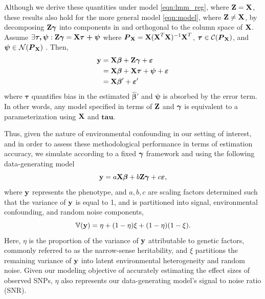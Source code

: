 Although we derive these quantities under model \ref{eqn:lmm_reg}, where $\textbf{Z} = \textbf{X}$, these results also hold for the more general model \ref{eqn:model}, where $\textbf{Z} \ne \textbf{X}$, by decomposing $\textbf{Z} \boldsymbol{\gamma}$ into components in and orthogonal to the column space of $\textbf{X}$. Assume  $\exists \boldsymbol{\tau, \psi}: \textbf{Z} \boldsymbol{\gamma} = \textbf{X} \boldsymbol{\tau + \psi}$ where $\boldsymbol{P}_{\textbf{X}} = \textbf{X} (\textbf{X}^T \textbf{X})^{-1} \textbf{X}^T$, $\boldsymbol{\tau} \in \mathcal{C}(\boldsymbol{P}_{\textbf{X}})$, and $\boldsymbol{\psi} \in \mathcal{N}(\boldsymbol{P}_{\textbf{X}})$ . Then,
\begin{align*}
    \textbf{y} &= \textbf{X}\boldsymbol{\beta} + \textbf{Z}\boldsymbol{\gamma} + \boldsymbol{\varepsilon}\\
    &= \textbf{X}\boldsymbol{\beta} + \textbf{X} \boldsymbol{\tau} + \boldsymbol{\psi} + \boldsymbol{\varepsilon}\\
    &=  \textbf{X} \boldsymbol{\beta}' + \boldsymbol{\varepsilon}'
\end{align*}
where $\boldsymbol{\tau}$ quantifies bias in the estimated $\boldsymbol{\hat{\beta}'}$ and $\boldsymbol{\psi}$ is absorbed by the error term. In other words, any model specified in terms of $\textbf{Z}$ and $\boldsymbol{\gamma}$ is equivalent to a parameterization using $\textbf{X}$ and $\boldsymbol{tau}$.

 Thus, given the nature of environmental confounding in our setting of interest, and in order to assess these methodological performance in terms of estimation accuracy, we simulate according to a fixed $\boldsymbol{\gamma}$ framework and using the following data-generating model
\begin{equation}
    \label{eqn:sim}
    \textbf{y} = a \textbf{X} \boldsymbol{\beta} + b \textbf{Z} \boldsymbol{\gamma} + c \boldsymbol{\varepsilon},
\end{equation}
where $\textbf{y}$ represents the phenotype, and $a, b, c$ are scaling factors determined such that the variance of $\textbf{y}$ is equal to 1, and is partitioned into signal, environmental confounding, and random noise components,
\begin{equation}
    \label{eqn:parition_y}
    \mathbb{V}(\textbf{y}) = \eta + (1 - \eta) \xi + (1-\eta)(1-\xi).
\end{equation}
Here, $\eta$ is the proportion of the variance of $\textbf{y}$ attributable to genetic factors, commonly referred to as the narrow-sense heritability, and $\xi$ partitions the remaining variance of $\textbf{y}$ into latent environmental heterogeneity and random noise.  Given our modeling objective of accurately estimating the effect sizes of observed SNPs, $\eta$ also represents our data-generating model's signal to noise ratio (SNR). 

